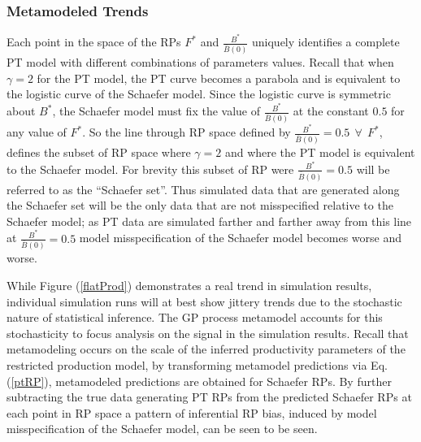 \documentclass[12pt]{article}
\begin{document}
%
\subsubsection{Metamodeled Trends}


%
Each point in the space of the RPs $F^*$ and $\frac{B^*}{\bar B(0)}$ uniquely 
identifies a complete PT model with different combinations of parameters values. 
Recall that when $\gamma=2$ for the PT model, the PT curve becomes a parabola 
and is equivalent to the logistic curve of the Schaefer model. Since the 
logistic curve is symmetric about $B^*$, the Schaefer model must fix the value of 
$\frac{B^*}{\bar B(0)}$ at the constant $0.5$ for any value of $F^*$. So 
the line through RP space defined by $\frac{B^*}{\bar B(0)}=0.5 ~~ \forall ~~ F^*$, 
defines the subset of RP space where $\gamma=2$ and where the PT model is 
equivalent to the Schaefer model. For brevity this subset of RP were $\frac{B^*}{\bar B(0)}=0.5$ 
will be referred to as the ``Schaefer set''. Thus simulated data that are 
generated along the Schaefer set will be the only data that are not 
misspecified relative to the Schaefer model; as PT data are simulated 
farther and farther away from this line at $\frac{B^*}{\bar B(0)}=0.5$ model 
misspecification of the Schaefer model becomes worse and worse.


%
While Figure (\ref{flatProd}) demonstrates a real trend in simulation results, 
individual simulation runs will at best show jittery trends due to the stochastic 
nature of statistical inference. The GP process metamodel accounts for this 
stochasticity %
to focus analysis on the signal in the simulation results. Recall that metamodeling 
occurs on the scale of the inferred productivity parameters of the restricted 
production model, 
by transforming metamodel predictions via Eq. (\ref{ptRP}), metamodeled predictions 
are obtained for Schaefer RPs. By further subtracting the true data generating 
PT RPs from the predicted Schaefer RPs at each point in RP space a pattern of 
inferential RP bias, induced by model misspecification of the Schaefer model, 
can be seen to be seen. %
\end{document}
